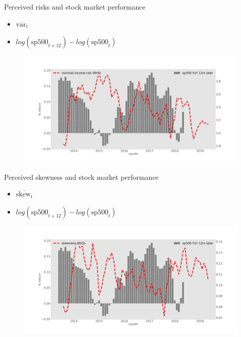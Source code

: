 \documentclass{beamer}
\begin{document}
\begin{frame}{Perceived risks and stock market performance}
	\begin{itemize}
		\item $\overline{\text{var}_{t}} $
\item  $log(\text{sp500}_{t+12}) - log(\text{sp500}_{t})$
\end{itemize}
	\begin{figure}
		\centering
		\label{ts_var}
		\includegraphics[width=\textwidth]{figures/tsMean3mvvar.jpg}
	\end{figure}
\end{frame}


\begin{frame}{Perceived skewness and stock market performance}
	\begin{itemize}
	\item $\overline{\text{skew}_{t}} $
	\item  $log(\text{sp500}_{t+12}) - log(\text{sp500}_{t})$
\end{itemize}
	\begin{figure}
		\centering 
		\label{ts_skew}
		\includegraphics[width=\textwidth]{figures/tsMean3mvskew.jpg}
	\end{figure}
\end{frame}
\end{document}
